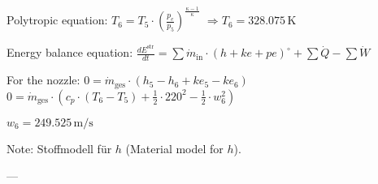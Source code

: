 Polytropic equation:  
\( T_6 = T_5 \cdot \left( \frac{p_e}{p_5} \right)^{\frac{\kappa - 1}{\kappa}} \)  
\( \Rightarrow T_6 = 328.075 \, \text{K} \)  

Energy balance equation:  
\( \frac{dE^{\text{str}}}{dt} = \sum \dot{m}_{\text{in}} \cdot (h + ke + pe)^{\circ} + \sum \dot{Q} - \sum \dot{W} \)  

For the nozzle:  
\( 0 = \dot{m}_{\text{ges}} \cdot (h_5 - h_6 + ke_5 - ke_6) \)  
\( 0 = \dot{m}_{\text{ges}} \cdot \left( c_p \cdot (T_6 - T_5) + \frac{1}{2} \cdot 220^2 - \frac{1}{2} \cdot w_6^2 \right) \)  

\( w_6 = 249.525 \, \text{m/s} \)  

Note: Stoffmodell für \( h \) (Material model for \( h \)).  

---